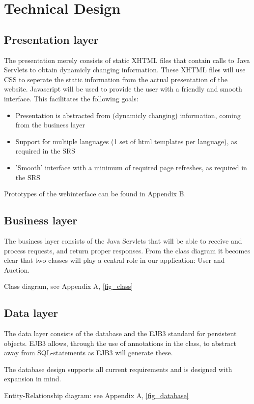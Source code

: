 \documentclass[a4paper, 12pt]{report}
\begin{document}
\chapter{Technical Design \label{Technical Design}}
\section{Presentation layer}
The presentation merely consists of static XHTML files that contain calls to Java Servlets to obtain dynamicly changing information. These XHTML files will use CSS to seperate the static information from the actual presentation of the website. Javascript will be used to provide the user with a friendly and smooth interface.
This facilitates the following goals:
\begin{itemize}
\item Presentation is abstracted from (dynamicly changing) information, coming from the business layer
\item Support for multiple languages (1 set of html templates per language), as required in the SRS
\item 'Smooth' interface with a minimum of required page refreshes, as required in the SRS
\end{itemize}
Prototypes of the webinterface can be found in Appendix B.

\section{Business layer}
The business layer consists of the Java Servlets that will be able to receive and process requests, and return proper responses.
From the class diagram it becomes clear that two classes will play a central role in our application: User and Auction.

Class diagram, see Appendix A, \ref{fig_class}

\section{Data layer}
The data layer consists of the database and the EJB3 standard for persistent objects. EJB3 allows, through the use of annotations in the class, to abstract away from SQL-statements as EJB3 will generate these.

The database design supports all current requirements and is designed with expansion in mind.

Entity-Relationship diagram: see Appendix A, \ref{fig_database}
\end{document}
